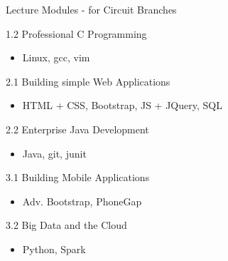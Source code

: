 \documentclass[12pt]{beamer}
\begin{document}
{\begin{frame}{Lecture Modules - for Circuit Branches} 
  \begin{description}[WWW]
  \item[PCP] 1.2 Professional C Programming
    \begin{itemize}
      \item Linux, gcc, vim
    \end{itemize}
  \item[BWA] 2.1 Building simple Web Applications
    \begin{itemize}
      \item HTML + CSS, Bootstrap, JS + JQuery, SQL
    \end{itemize}
  \item[EJD] 2.2 Enterprise Java Development
    \begin{itemize}
    \item Java, git, junit 
    \end{itemize}
  \item[BMA] 3.1 Building Mobile Applications
    \begin{itemize}
      \item Adv. Bootstrap, PhoneGap
    \end{itemize}
  \item[BDC] 3.2 Big Data and the Cloud 
    \begin{itemize}
      \item Python, Spark 
    \end{itemize}
  \end{description}
\end{frame}

}
\end{document}

